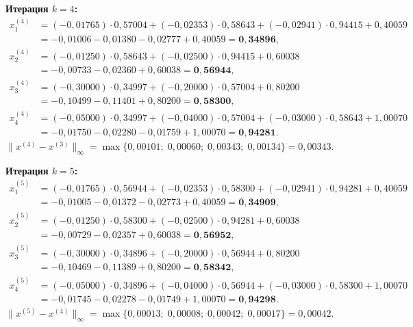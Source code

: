 \documentclass[a4paper, final]{article}
\begin{document}
\medskip\textbf{Итерация $k=4$:}
\begin{align*}
x_1^{(4)} &= (-0{,}01765)\cdot0{,}57004 + (-0{,}02353)\cdot0{,}58643 + (-0{,}02941)\cdot0{,}94415 + 0{,}40059\\
           &= -0{,}01006 - 0{,}01380 - 0{,}02777 + 0{,}40059 = \mathbf{0{,}34896},\\
x_2^{(4)} &= (-0{,}01250)\cdot0{,}58643 + (-0{,}02500)\cdot0{,}94415 + 0{,}60038\\
           &= -0{,}00733 - 0{,}02360 + 0{,}60038 = \mathbf{0{,}56944},\\
x_3^{(4)} &= (-0{,}30000)\cdot0{,}34997 + (-0{,}20000)\cdot0{,}57004 + 0{,}80200\\
           &= -0{,}10499 - 0{,}11401 + 0{,}80200 = \mathbf{0{,}58300},\\
x_4^{(4)} &= (-0{,}05000)\cdot0{,}34997 + (-0{,}04000)\cdot0{,}57004 + (-0{,}03000)\cdot0{,}58643 + 1{,}00070\\
           &= -0{,}01750 - 0{,}02280 - 0{,}01759 + 1{,}00070 = \mathbf{0{,}94281}.
\end{align*}
$\|x^{(4)}-x^{(3)}\|_\infty = \max\{0{,}00101;\;0{,}00060;\;0{,}00343;\;0{,}00134\} = 0{,}00343.$

\medskip\textbf{Итерация $k=5$:}
\begin{align*}
x_1^{(5)} &= (-0{,}01765)\cdot0{,}56944 + (-0{,}02353)\cdot0{,}58300 + (-0{,}02941)\cdot0{,}94281 + 0{,}40059\\
           &= -0{,}01005 - 0{,}01372 - 0{,}02773 + 0{,}40059 = \mathbf{0{,}34909},\\
x_2^{(5)} &= (-0{,}01250)\cdot0{,}58300 + (-0{,}02500)\cdot0{,}94281 + 0{,}60038\\
           &= -0{,}00729 - 0{,}02357 + 0{,}60038 = \mathbf{0{,}56952},\\
x_3^{(5)} &= (-0{,}30000)\cdot0{,}34896 + (-0{,}20000)\cdot0{,}56944 + 0{,}80200\\
           &= -0{,}10469 - 0{,}11389 + 0{,}80200 = \mathbf{0{,}58342},\\
x_4^{(5)} &= (-0{,}05000)\cdot0{,}34896 + (-0{,}04000)\cdot0{,}56944 + (-0{,}03000)\cdot0{,}58300 + 1{,}00070\\
           &= -0{,}01745 - 0{,}02278 - 0{,}01749 + 1{,}00070 = \mathbf{0{,}94298}.
\end{align*}
$\|x^{(5)}-x^{(4)}\|_\infty = \max\{0{,}00013;\;0{,}00008;\;0{,}00042;\;0{,}00017\} = 0{,}00042.$
\end{document}

